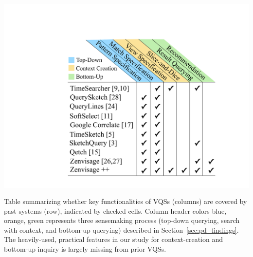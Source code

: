 \vspace{-10pt}
\begin{table} 
    \includegraphics[width=0.8\linewidth]{figures/related_works_table.pdf}
    \caption{Table summarizing whether key functionalities of VQSs (columns) are covered by past systems (row), indicated by checked cells. Column header colors blue, orange, green represents three sensemaking process (top-down querying, search with context, and bottom-up querying) described in Section~\ref{sec:pd_findings}. The heavily-used, practical features in our study for context-creation and bottom-up inquiry is largely missing from prior VQSs.}
    \label{table:relatedwork}
    \vspace{-29pt}
\end{table}
